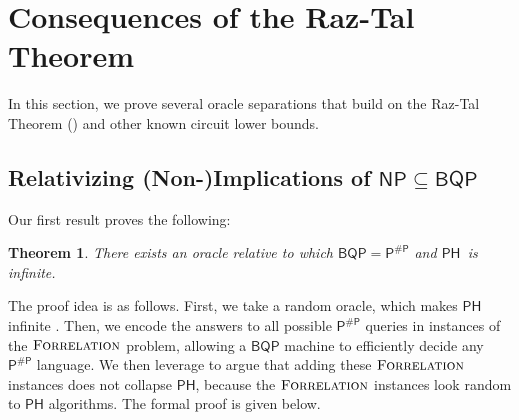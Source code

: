 \documentclass[10pt,a4paper]{article}
\newtheorem{theorem}{Theorem}
\newcommand{\Forrelation}{\normalfont\textsc{Forrelation}}
\begin{document}
\section{Consequences of the Raz-Tal Theorem}

In this section, we prove several oracle separations that build on the Raz-Tal Theorem () and other known circuit lower bounds.

\subsection{Relativizing (Non-)Implications of \texorpdfstring{$\mathsf{NP}\subseteq\mathsf{BQP}$}{NP in BQP}}

Our first result proves the following:

\begin{theorem}
\label{thm:bqp=pp_ph_infinite}
There exists an oracle relative to which $\mathsf{BQP} = \mathsf{P^{\# P}}$ and $\mathsf{PH}$\ is infinite.
\end{theorem}

The proof idea is as follows. First, we take a random oracle, which makes $\mathsf{PH}$ infinite \cite{HRST17,RST15}. Then, we encode the answers to all possible $\mathsf{P^{\# P}}$ queries in instances of the $\Forrelation$ problem, allowing a $\mathsf{BQP}$ machine to efficiently decide any $\mathsf{P^{\# P}}$ language. We then leverage  to argue that adding these $\Forrelation$ instances does not collapse $\mathsf{PH}$, because the $\Forrelation$ instances look random to $\mathsf{PH}$ algorithms. The formal proof is given below.
\end{document}
